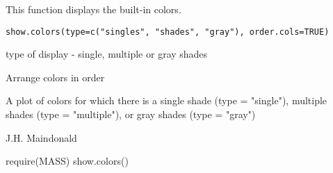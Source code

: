 \begin{Description}\relax
This function displays the built-in colors.
\end{Description}
\begin{Usage}
\begin{verbatim}
show.colors(type=c("singles", "shades", "gray"), order.cols=TRUE)
\end{verbatim}
\end{Usage}
\begin{Arguments}
\begin{ldescription}
\item[\code{type}] type of display - single, multiple or gray shades
\item[\code{order.cols}] Arrange colors in order 
\end{ldescription}
\end{Arguments}
\begin{Value}
A plot of colors for which there is a single shade (type = "single"),
multiple shades (type = "multiple"), or gray shades (type = "gray")
\end{Value}
\begin{Author}\relax
J.H. Maindonald
\end{Author}
\begin{Examples}
\begin{ExampleCode}
require(MASS)
show.colors()
\end{ExampleCode}
\end{Examples}

